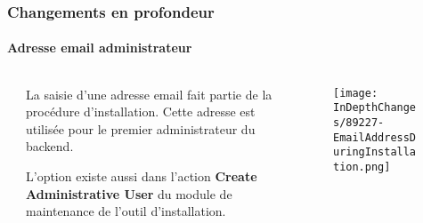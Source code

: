 
\begin{frame}[fragile]
	\frametitle{Changements en profondeur}
	\framesubtitle{Adresse email administrateur}

	\begin{columns}[T]
		\begin{column}{.04\textwidth}
		\end{column}
		\begin{column}{.38\textwidth}

			La saisie d'une adresse email fait partie de la procédure d'installation.
			Cette adresse est utilisée pour le premier administrateur du backend.

			\vspace{0.2cm}

			L'option existe aussi dans l'action \textbf{Create Administrative User} du
			module de maintenance de l'outil d'installation.

		\end{column}
		\begin{column}{.58\textwidth}
			\vspace{-0.3cm}
			\begin{figure}
				\texttt{[image: InDepthChanges/89227-EmailAddressDuringInstallation.png]}
			\end{figure}
		\end{column}
	\end{columns}

\end{frame}


